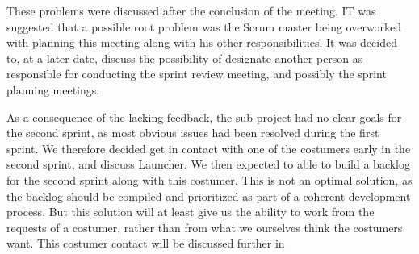 These problems were discussed after the conclusion of the meeting. IT was suggested that a possible root problem was the \giraf Scrum master being overworked with planning this meeting along with his other responsibilities. It was decided to, at a later date, discuss the possibility of designate another person as responsible for conducting the sprint review meeting, and possibly the sprint planning meetings.

As a consequence of the lacking feedback, the \launcher sub-project had no clear goals for the second sprint, as most obvious issues had been resolved during the first sprint. We therefore decided get in contact with one of the costumers early in the second sprint, and discuss Launcher. We then expected to able to build a backlog for the second sprint along with this costumer. This is not an optimal solution, as the backlog should be compiled and prioritized as part of a coherent development process. But this solution will at least give us the ability to work from the requests of a costumer, rather than from what we ourselves think the costumers want. This costumer contact will be discussed further in 



